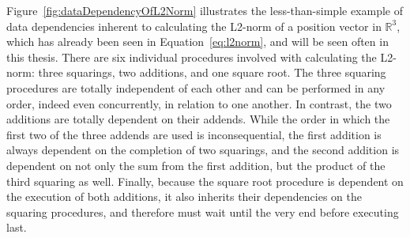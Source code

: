 Figure~\ref{fig:dataDependencyOfL2Norm} illustrates the less-than-simple example of data dependencies inherent to calculating the L2-norm of a position vector in $\mathbb{R}^{3}$, which has already been seen in Equation~\ref{eq:l2norm}, and will be seen often in this thesis. There are six individual procedures involved with calculating the L2-norm: three squarings, two additions, and one square root. The three squaring procedures are totally independent of each other and can be performed in any order, indeed even concurrently, in relation to one another. In contrast, the two additions are totally dependent on their addends. While the order in which the first two of the three addends are used is inconsequential, the first addition is always dependent on the completion of two squarings, and the second addition is dependent on not only the sum from the first addition, but the product of the third squaring as well. Finally, because the square root procedure is dependent on the execution of both additions, it also inherits their dependencies on the squaring procedures, and therefore must wait until the very end before executing last.

